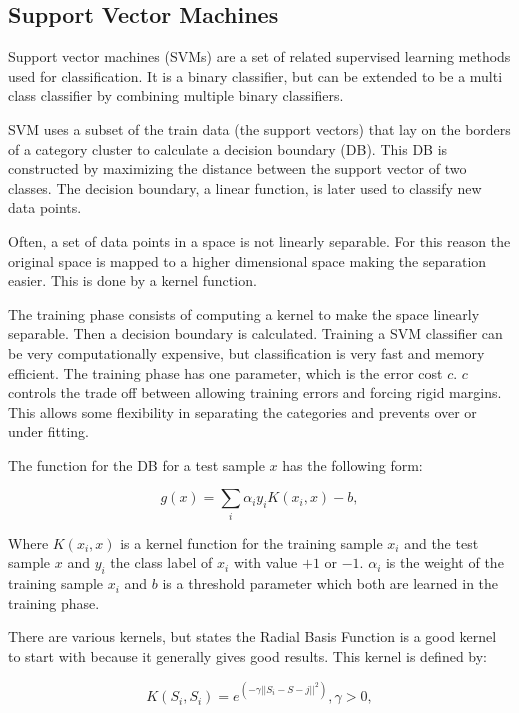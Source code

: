 \subsection*{Support Vector Machines}

Support vector machines (SVMs) are a set of related supervised learning methods used for classification. It is a binary classifier, but can be extended to be a multi class classifier by combining multiple binary classifiers. 

SVM uses a subset of the train data (the support vectors) that lay on the borders of a category cluster to calculate a decision boundary (DB). This DB is constructed by maximizing the distance between the support vector of two classes. The decision boundary, a linear function, is later used to classify new data points.

Often, a set of data points in a space is not linearly separable. For this reason the original space is mapped to a higher dimensional space making the separation easier. This is done by a kernel function.

The training phase consists of computing a kernel to make the space linearly separable. Then a decision boundary is calculated. Training a SVM classifier can be very computationally expensive, but classification is very fast and memory efficient. The training phase has one parameter, which is the error cost $c$. $c$ controls the trade off between allowing training errors and forcing rigid margins. This allows some flexibility in separating the categories and prevents over or under fitting.

The function for the DB for a test sample $x$ has the following form:

\begin{equation}
	g(x) = \sum_i{\alpha_i y_i K(x_i,x) -b},
\end{equation}

Where $K(x_i,x)$ is a kernel function for the training sample $x_i$ and the test sample $x$ and $y_i$ the class label of $x_i$ with value $+1$ or $-1$. $\alpha_i$ is the weight of the training sample $x_i$ and $b$ is a threshold parameter which both are learned in the training phase.  

There are various kernels, but \cite{Hsu2003} states the Radial Basis Function is a good kernel to start with because it generally gives good results. This kernel is defined by:

\begin{equation}
	K(S_i,S_i) = e^{(-\gamma||S_i-S-j||^2)}, \gamma > 0,
\end{equation}

